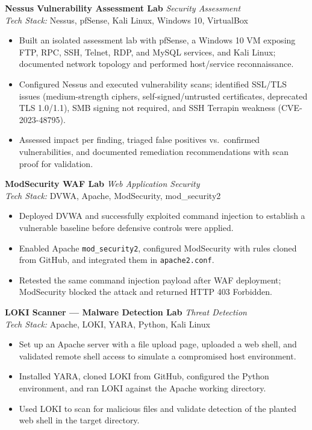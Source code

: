 \documentclass[11pt,a4paper]{article}
\newcommand{\resumeItemList}{\begin{itemize}[leftmargin=*, nosep, topsep=2pt]}
\newcommand{\resumeItemListEnd}{\end{itemize}}
\begin{document}
\textbf{Nessus Vulnerability Assessment Lab} \hfill \textit{Security Assessment} \\
\textit{Tech Stack:} Nessus, pfSense, Kali Linux, Windows 10, VirtualBox
\resumeItemList
  \item Built an isolated assessment lab with pfSense, a Windows 10 VM exposing FTP, RPC, SSH, Telnet, RDP, and MySQL services, and Kali Linux; documented network topology and performed host/service reconnaissance.
  \item Configured Nessus and executed vulnerability scans; identified SSL/TLS issues (medium-strength ciphers, self-signed/untrusted certificates, deprecated TLS 1.0/1.1), SMB signing not required, and SSH Terrapin weakness (CVE-2023-48795).
  \item Assessed impact per finding, triaged false positives vs.\ confirmed vulnerabilities, and documented remediation recommendations with scan proof for validation.
\resumeItemListEnd

\vspace{4pt}

\textbf{ModSecurity WAF Lab} \hfill \textit{Web Application Security} \\
\textit{Tech Stack:} DVWA, Apache, ModSecurity, mod\_security2
\resumeItemList
  \item Deployed DVWA and successfully exploited command injection to establish a vulnerable baseline before defensive controls were applied.
  \item Enabled Apache \texttt{mod\_security2}, configured ModSecurity with rules cloned from GitHub, and integrated them in \texttt{apache2.conf}.
  \item Retested the same command injection payload after WAF deployment; ModSecurity blocked the attack and returned HTTP 403 Forbidden.
\resumeItemListEnd

\vspace{4pt}

\textbf{LOKI Scanner --- Malware Detection Lab} \hfill \textit{Threat Detection} \\
\textit{Tech Stack:} Apache, LOKI, YARA, Python, Kali Linux
\resumeItemList
  \item Set up an Apache server with a file upload page, uploaded a web shell, and validated remote shell access to simulate a compromised host environment.
  \item Installed YARA, cloned LOKI from GitHub, configured the Python environment, and ran LOKI against the Apache working directory.
  \item Used LOKI to scan for malicious files and validate detection of the planted web shell in the target directory.
\resumeItemListEnd
\end{document}
